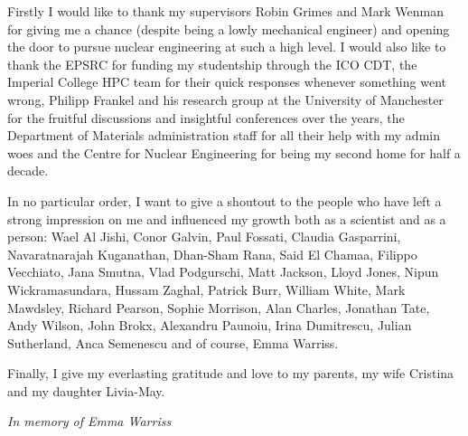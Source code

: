 \cleardoublepage


\begin{acknowledgements}

Firstly I would like to thank my supervisors Robin Grimes and Mark Wenman for giving me a chance (despite being a lowly mechanical engineer) and opening the door to pursue nuclear engineering at such a high level. I would also like to thank the EPSRC for funding my studentship through the ICO CDT, the Imperial College HPC team for their quick responses whenever something went wrong, Philipp Frankel and his research group at the University of Manchester for the fruitful discussions and insightful conferences over the years, the Department of Materials administration staff for all their help with my admin woes and the Centre for Nuclear Engineering for being my second home for half a decade.

In no particular order, I want to give a shoutout to the people who have left a strong impression on me and influenced my growth both as a scientist and as a person: Wael Al Jishi, Conor Galvin, Paul Fossati, Claudia Gasparrini, Navaratnarajah Kuganathan, Dhan-Sham Rana, Said El Chamaa, Filippo Vecchiato, Jana Smutna, Vlad Podgurschi, Matt Jackson, Lloyd Jones, Nipun Wickramasundara, Hussam Zaghal, Patrick Burr, William White, Mark Mawdsley, Richard Pearson, Sophie Morrison, Alan Charles, Jonathan Tate, Andy Wilson, John Brokx, Alexandru Paunoiu, Irina Dumitrescu, Julian Sutherland, Anca Semenescu and of course, Emma Warriss.

Finally, I give my everlasting gratitude and love to my parents, my wife Cristina and my daughter Livia-May.

\clearpage

\vfill
\begin{center}
\emph{In memory of Emma Warriss}
\end{center}
\vfill

\end{acknowledgements}